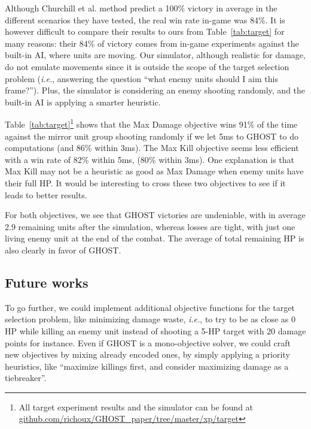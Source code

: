 \documentclass{article}
\newcommand{\ghost}{\textsc{GHOST}\xspace}
\newcommand{\ie}{\textit{i.e.}}
\begin{document}
Although Churchill et al. method predict a 100\% victory in average in
the different  scenarios they have  tested, the real win  rate in-game
was 84\%.   It is however difficult  to compare their results  to ours
from Table~\ref{tab:target}  for many  reasons: their 84\%  of victory
comes from  in-game experiments against  the built-in AI,  where units
are  moving. Our  simulator,  although realistic  for  damage, do  not
emulate  movements  since  it  is  outside the  scope  of  the  target
selection  problem (\ie,  answering  the question  ``what enemy  units
should I  aim this  frame?''). Plus, the  simulator is  considering an
enemy shooting  randomly, and  the built-in AI  is applying  a smarter
heuristic.

Table~\ref{tab:target}\footnote{All target experiment  results and the
  simulator            can            be           found            at
  \href{https://github.com/richoux/GHOST\_paper/tree/master/xp/target}{github.com/richoux/GHOST\_paper/tree/master/xp/target}}
shows that the Max Damage objective  wins 91\% of the time against the
mirror unit  group shooting  randomly if  we let 5ms  to \ghost  to do
computations (and 86\% within 3ms).  The Max Kill objective seems less
efficient with a  win rate of 82\% within 5ms,  (80\% within 3ms). One
explanation is  that Max Kill  may not be a  heuristic as good  as Max
Damage when enemy  units have their full HP.  It  would be interesting
to cross these two objectives to see if it leads to better results.

For both objectives, we see that \ghost victories are undeniable, with
in average  2.9 remaining units  after the simulation,  whereas losses
are  tight,  with  just one  living  enemy  unit  at  the end  of  the
combat. The average of total remaining  HP is also clearly in favor of
\ghost.

\subsection{Future works}

To go further,  we could implement additional  objective functions for
the target  selection problem, like  minimizing damage waste,  \ie, to
try to  be as close  as 0  HP while killing  an enemy unit  instead of
shooting a  5-HP target with 20  damage points for instance.   Even if
\ghost is  a mono-objective solver,  we could craft new  objectives by
mixing already encoded ones, by simply applying a priority heuristics,
like ``maximize  killings first, and  consider maximizing damage  as a
tiebreaker''.
\end{document}
